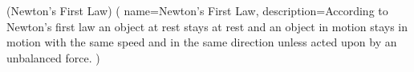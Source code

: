 \newglossaryentry(Newton's First Law)
(
     name=Newton's First Law,
     description={According to Newton's first law an object at rest stays at rest and an object in motion stays in motion with the same speed and in the same direction unless acted upon by an unbalanced force.}
     )
